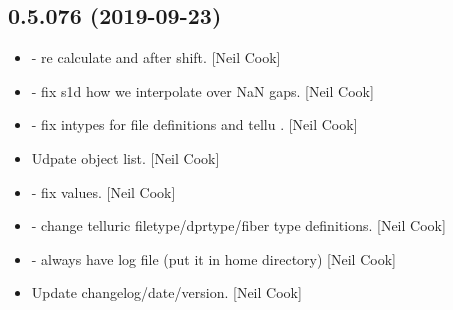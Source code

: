 \documentclass[a4paper,10pt,english]{report}
\begin{document}
\subsection{0.5.076 (2019-09-23)}
\label{\detokenize{misc/changelog:id66}}\begin{itemize}
\item {} 
 - re calculate  and 
after shift. {[}Neil Cook{]}

\item {} 
 - fix s1d how we interpolate over NaN gaps.
{[}Neil Cook{]}

\item {} 
 -
fix intypes for file definitions and tellu . {[}Neil Cook{]}

\item {} 
Udpate object list. {[}Neil Cook{]}

\item {} 
 - fix
 values. {[}Neil Cook{]}

\item {} 
 - change telluric
filetype/dprtype/fiber type definitions. {[}Neil Cook{]}

\item {} 
 - always have log file (put it in home directory)
{[}Neil Cook{]}

\item {} 
Update changelog/date/version. {[}Neil Cook{]}

\end{itemize}
\end{document}
